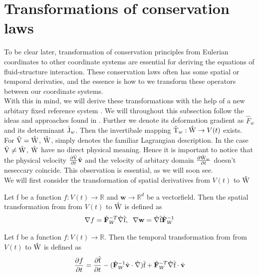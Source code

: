 \section{Transformations of conservation laws}
To be clear later, transformation of conservation principles from Eulerian coordinates to other coordinate systems are essential for deriving the equations of fluid-structure interaction. These conservation laws often has some spatial or temporal derivaties, and the essence is how to we transform these operators between our coordinate systems. \\
With this in mind, we will derive these transformations with the help of a new arbitary fixed reference system . We will throughout this subsection follow the ideas and approaches found in \cite{Richter2016}. Further we denote its deformation gradient as $\hat{F}_w$ and its determinant $\text{\^{J}}_w$. Then the invertibale mapping $\text{\^{T}}_w : \text{\^{W}} \rightarrow V(t)$ exists. \\
For $\text{\^{V}} = \text{\^{W}}$, $\text{\^{W}}$, simply denotes the familiar Lagrangian description.
In the case $\text{\^{V}} \neq \text{\^{W}}$, $\text{\^{W}}$ have no direct physical meaning.  Hence it is important to notice that the physical velocity $\pder{\ha{V}}{t} \hat{v}$ and the velocity of arbitary domain $\frac{\partial \text{\^{W}}_w}{\partial t}$ doesn't neseccary coincide. This observation is essential, as we will soon see. \\
We will first consider the transformation of spatial derivatives from $V(t)$ to $\text{\^{W}}$ \\

\begin{lemma}
Let f be a function $f : V(t) \rightarrow \mathbb{R}$ and $\mathbf{w} \rightarrow \mathbb{R}^d$ be a vectorfield. Then the spatial transformation
from from $V(t)$ to $\text{\^{W}}$ is defined as
\begin{align*}
\nabla f = \hat{F}_W^{-T} \hat{\nabla} \ha{f}, \hspace{2mm} 
\nabla \mathbf{w} =  \hat{\nabla} \ha{f} \hat{F}_W^{-1}
\end{align*} 
\end{lemma}

\begin{lemma}
Let f be a function $f : V(t) \rightarrow \mathbb{R}$. Then the temporal transformation from from $V(t)$ to $\text{\^{W}}$ is defined as
\begin{align*}
\pder{f}{t} = \pder{\ha{f}}{t} - (\hat{F}_W^{-1} \hat{v} \cdot \hat{\nabla}) \ha{f}
+ \hat{F}_W^{-T} \hat{\nabla} \ha{f} \cdot \hat{v}
\end{align*} 
\end{lemma}


